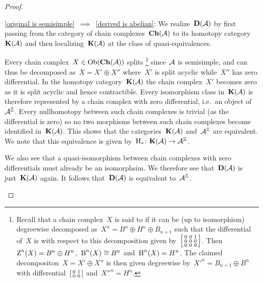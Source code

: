 \documentclass[a4paper,10pt]{scrartcl}
\begin{document}
\begin{proof}
  \leavevmode
  \begin{implicationslist}
    \item[\ref{original is semisimple}~$\implies$~\ref{derived is abelian}:]
      We realize~$\mathbf{D}(\mathcal{A})$ by first passing from the category of chain complexes~$\mathbf{Ch}(\mathcal{A})$ to its homotopy category~$\mathbf{K}(\mathcal{A})$ and then localizing~$\mathbf{K}(\mathcal{A})$ at the class of quasi-equivalences.
      
      Every chain complex~$X \in \operatorname{Ob}(\mathbf{Ch}(\mathcal{A}))$ splits%
      \footnote{Recall that a chain complex~$X$ is said to  if it can be (up to isomorphism) degreewise decomposed as~$X^n = B^n \oplus H^n \oplus B_{n+1}$ such that the differential of~$X$ is with respect to this decomposition given by~$\begin{bsmallmatrix} 0 & 0 & 1 \\ 0 & 0 & 0 \\ 0 & 0 & 0 \end{bsmallmatrix}$.
      Then~$\operatorname{Z}^n(X) = B^n \oplus H^n$,~$\operatorname{B}^n(X) \cong B^n$ and~$\operatorname{H}^n(X) = H^n$.
      The claimed decompositon~$X = X' \oplus X''$ is then given degreewise by~$X'^n = B_{n+1} \oplus B^n$ with differential~$\begin{bsmallmatrix} 0 & 1 \\ 0 & 0 \end{bsmallmatrix}$ and~$X''^n = H^n$.}
      since~$\mathcal{A}$ is semisimple, and can thus be decomposed as~$X = X' \oplus X''$ where~$X'$ is split acyclic while~$X''$ has zero differential.
      In the homotopy category~$\mathbf{K}(\mathcal{A})$ the chain complex~$X'$ becomes zero as it is split acyclic and hence contractible.
      Every isomorphism class in~$\mathbf{K}(\mathcal{A})$ is therefore represented by a chain complex with zero differential, i.e.\ an object of~$\mathcal{A}^{\mathbb{Z}}$.
      Every nullhomotopy between such chain complexes is trivial (as the differential is zero) so no two morphisms between such chain complexes become identified in~$\mathbf{K}(\mathcal{A})$.
      This shows that the categories~$\mathbf{K}(\mathcal{A})$ and~$\mathcal{A}^{\mathbb{Z}}$ are equivalent.
      We note that this equivalence is given by~$\operatorname{H}_* \colon \mathbf{K}(\mathcal{A}) \to \mathcal{A}^{\mathbb{Z}}$.
      
      We also see that a quasi-isomorphism between chain complexes with zero differentials must already be an isomorphsim.
      We therefore see that~$\mathbf{D}(\mathcal{A})$ is just~$\mathbf{K}(\mathcal{A})$ again.
      It follows that~$\mathbf{D}(\mathcal{A})$ is equivalent to~$\mathcal{A}^{\mathbb{Z}}$.
      

\end{implicationslist}
\end{proof}
\end{document}
